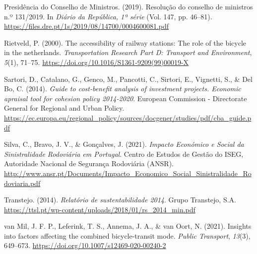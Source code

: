 \documentclass[review, doubleblind, 3p,
authoryear]{elsarticle} %
\newlength{\cslhangindent}
\newlength{\cslentryspacingunit} %
\newenvironment{CSLReferences}[2] %
 {%
  \setlength{\parindent}{0pt}
  \ifodd #1
  \let\oldpar\par
  \def\par{\hangindent=\cslhangindent\oldpar}
  \fi
  \setlength{\parskip}{#2\cslentryspacingunit}
 }%
 {}
\begin{document}
\begin{CSLReferences}{1}{0}
\leavevmode{}%
Presidência do Conselho de Ministros. (2019). Resolução do conselho de
ministros n.º 131/2019. In \emph{Diário da República, 1ª série} (Vol.
147, pp. 46--81).
\url{https://files.dre.pt/1s/2019/08/14700/0004600081.pdf}

\leavevmode{}%
Rietveld, P. (2000). The accessibility of railway stations: The role of
the bicycle in the netherlands. \emph{Transportation Research Part D:
Transport and Environment}, \emph{5}(1), 71--75.
\url{https://doi.org/10.1016/S1361-9209(99)00019-X}

\leavevmode{}%
Sartori, D., Catalano, G., Genco, M., Pancotti, C., Sirtori, E.,
Vignetti, S., \& Del Bo, C. (2014). \emph{Guide to cost-benefit analysis
of investment projects. Economic apraisal tool for cohesion policy
2014-2020}. {European Commission - Directorate General for Regional and
Urban Policy}.
\url{https://ec.europa.eu/regional_policy/sources/docgener/studies/pdf/cba_guide.pdf}

\leavevmode{}%
Silva, C., Bravo, J. V., \& Gonçalves, J. (2021). \emph{{Impacto
Económico e Social da Sinistralidade Rodoviária em Portugal}}. {Centro
de Estudos de Gestão do ISEG, Autoridade Nacional de Segurança
Rodoviária (ANSR)}.
\url{http://www.ansr.pt/Documents/Impacto_Economico_Social_Sinistralidade_Rodoviaria.pdf}

\leavevmode{}%
Transtejo. (2014). \emph{Relatório de sustentabilidade 2014}. {Grupo
Transtejo, S.A.}
\url{https://ttsl.pt/wp-content/uploads/2018/01/rs_2014_min.pdf}

\leavevmode{}%
van Mil, J. F. P., Leferink, T. S., Annema, J. A., \& van Oort, N.
(2021). Insights into factors affecting the combined bicycle-transit
mode. \emph{Public Transport}, \emph{13}(3), 649--673.
\url{https://doi.org/10.1007/s12469-020-00240-2}

\end{CSLReferences}
\end{document}
